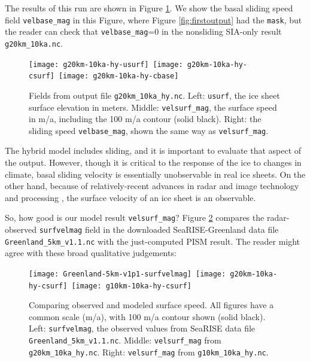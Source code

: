 The results of this run are shown in Figure \ref{fig:secondoutputcoarse}.  We show the basal sliding speed field \texttt{velbase_mag} in this Figure, where Figure \ref{fig:firstoutput} had the \texttt{mask}, but the reader can check that \texttt{velbase_mag}=0 in the nonsliding SIA-only result \texttt{g20km_10ka.nc}.

\begin{figure}[ht]
\centering
\mbox{\texttt{[image: g20km-10ka-hy-usurf]} \texttt{[image: g20km-10ka-hy-csurf]} \texttt{[image: g20km-10ka-hy-cbase]}}
\caption{Fields from output file \texttt{g20km_10ka_hy.nc}.  Left: \texttt{usurf}, the ice sheet surface elevation in meters.  Middle: \texttt{velsurf_mag}, the surface speed in m/a, including the 100 m/a contour (solid black).  Right: the sliding speed \texttt{velbase_mag}, shown the same way as \texttt{velsurf_mag}.}
\label{fig:secondoutputcoarse}
\end{figure}

The hybrid model includes sliding, and it is important to evaluate that aspect of the output.  However, though it is critical to the response of the ice to changes in climate, basal sliding velocity is essentially unobservable in real ice sheets.  On the other hand, because of relatively-recent advances in radar and image technology and processing \cite{Joughin2002}, the surface velocity of an ice sheet is an observable.

So, how good is our model result \texttt{velsurf_mag}?  Figure \ref{fig:csurfvsobserved} compares the radar-observed \texttt{surfvelmag} field in the downloaded SeaRISE-Greenland data file \texttt{Greenland_5km_v1.1.nc} with the just-computed PISM result.  The reader might agree with these broad qualitative judgements:

\begin{figure}[ht]
\centering
\mbox{\texttt{[image: Greenland-5km-v1p1-surfvelmag]} \texttt{[image: g20km-10ka-hy-csurf]} \texttt{[image: g10km-10ka-hy-csurf]}}
\caption{Comparing observed and modeled surface speed.  All figures have a common scale (m/a), with 100 m/a contour shown (solid black).  Left: \texttt{surfvelmag}, the observed values from SeaRISE data file \texttt{Greenland_5km_v1.1.nc}.  Middle: \texttt{velsurf_mag} from \texttt{g20km_10ka_hy.nc}.  Right: \texttt{velsurf_mag} from \texttt{g10km_10ka_hy.nc}.}
\label{fig:csurfvsobserved}
\end{figure}

